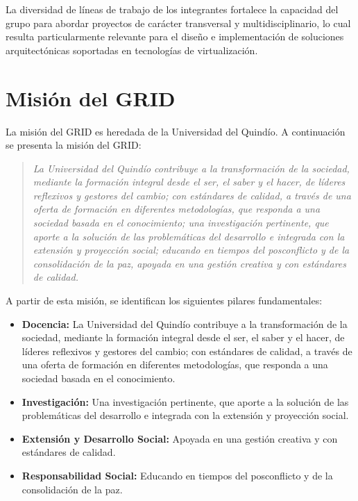 La diversidad de líneas de trabajo de los integrantes fortalece la capacidad del grupo para abordar proyectos de carácter transversal y multidisciplinario, lo cual resulta particularmente relevante para el diseño e implementación de soluciones arquitectónicas soportadas en tecnologías de virtualización.

\section{Misión del GRID}
La misión del GRID es heredada de la Universidad del Quindío. A continuación se presenta la misión del GRID:\@

\begin{quote}
\textit{La Universidad del Quindío contribuye a la transformación de la sociedad, mediante la formación integral desde el ser, el saber y el hacer, de líderes reflexivos y gestores del cambio; con estándares de calidad, a través de una oferta de formación en diferentes metodologías, que responda a una sociedad basada en el conocimiento; una investigación pertinente, que aporte a la solución de las problemáticas del desarrollo e integrada con la extensión y proyección social; educando en tiempos del posconflicto y de la consolidación de la paz, apoyada en una gestión creativa y con estándares de calidad.}
\end{quote}

A partir de esta misión, se identifican los siguientes pilares fundamentales:

\begin{itemize}
    \item \textbf{Docencia:} La Universidad del Quindío contribuye a la transformación de la sociedad, mediante la formación integral desde el ser, el saber y el hacer, de líderes reflexivos y gestores del cambio; con estándares de calidad, a través de una oferta de formación en diferentes metodologías, que responda a una sociedad basada en el conocimiento.

    \item \textbf{Investigación:} Una investigación pertinente, que aporte a la solución de las problemáticas del desarrollo e integrada con la extensión y proyección social.

    \item \textbf{Extensión y Desarrollo Social:} Apoyada en una gestión creativa y con estándares de calidad.

    \item \textbf{Responsabilidad Social:} Educando en tiempos del posconflicto y de la consolidación de la paz.
\end{itemize}

